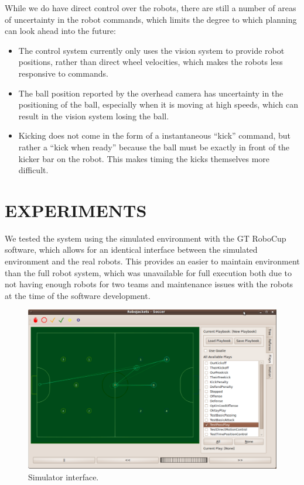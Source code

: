 \documentclass[a4paper, 10pt, conference]{ieeeconf}      %
\begin{document}
While we do have direct control over the robots, there are still a number of areas of uncertainty in the robot commands, which limits the degree to which planning can look ahead into the future:
\begin{itemize}
 \item The control system currently only uses the vision system to provide robot positions, rather than direct wheel velocities, which makes the robots less responsive to commands.
 \item The ball position reported by the overhead camera has uncertainty in the positioning of the ball, especially when it is moving at high speeds, which can result in the vision system losing the ball.
 \item Kicking does not come in the form of a instantaneous ``kick'' command, but rather a ``kick when ready'' because the ball must be exactly in front of the kicker bar on the robot.  This makes timing the kicks themselves more difficult.  
\end{itemize}

\section{EXPERIMENTS}
We tested the system using the simulated environment with the GT RoboCup software, which allows for an identical interface between the simulated environment and the real robots. This provides an easier to maintain environment than the full robot system, which was unavailable for full execution both due to not having enough robots for two teams and maintenance issues with the robots at the time of the software development.  

\begin{figure}[ht!]
\begin{center}
\includegraphics[totalheight=1.6in]{ui}
\end{center}
\caption{Simulator interface.}
\label{experiment1fig1}
\end{figure}
\end{document}
